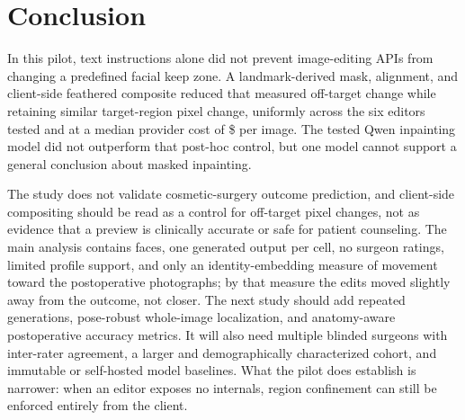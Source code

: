 \section{Conclusion}
\label{sec:conclusion}

In this pilot, text instructions alone did not prevent image-editing APIs
from changing a predefined facial keep zone. A landmark-derived mask,
alignment, and client-side feathered composite reduced that measured off-target
change while retaining similar target-region pixel change, uniformly across the
six editors tested and at a median provider cost of \$\MedCost{} per image. The
tested Qwen inpainting model did not outperform that post-hoc control, but
one model cannot support a general conclusion about masked inpainting.

The study does not validate cosmetic-surgery outcome prediction, and
client-side compositing should be read as a control for off-target pixel
changes, not as evidence that a preview is clinically accurate or safe for
patient counseling. The main analysis contains \NumPrimaryFaces{} faces, one
generated output per cell, no surgeon ratings, limited profile support, and
only an identity-embedding measure of movement toward the postoperative
photographs; by that measure the edits moved slightly away from the outcome,
not closer. The next study should add repeated generations, pose-robust
whole-image localization, and anatomy-aware postoperative accuracy metrics. It will
also need multiple blinded surgeons with inter-rater agreement, a larger and
demographically characterized cohort, and immutable or self-hosted model
baselines. What the pilot does establish is
narrower: when an editor exposes no internals, region confinement can still be
enforced entirely from the client.
